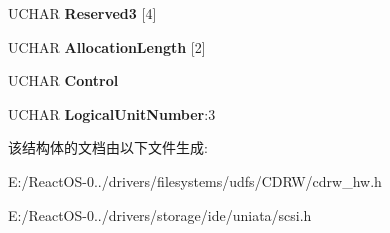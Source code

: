 \begin{DoxyCompactItemize}
\item 
\mbox{\label{struct___c_d_b_1_1___m_o_d_e___s_e_n_s_e10_a22e255f3d06a4b6a8feea7ac8bc6f33f}} 
U\+C\+H\+AR {\bfseries Reserved3} \mbox{[}4\mbox{]}
\item 
\mbox{\label{struct___c_d_b_1_1___m_o_d_e___s_e_n_s_e10_a252fd134d6c5e105852262403f0f500a}} 
U\+C\+H\+AR {\bfseries Allocation\+Length} \mbox{[}2\mbox{]}
\item 
\mbox{\label{struct___c_d_b_1_1___m_o_d_e___s_e_n_s_e10_a9e3bc9cfd082c6bf59c975fcfa9af092}} 
U\+C\+H\+AR {\bfseries Control}
\item 
\mbox{\label{struct___c_d_b_1_1___m_o_d_e___s_e_n_s_e10_a481e64fc3fb3847e4fa88839ab2d1b5d}} 
U\+C\+H\+AR {\bfseries Logical\+Unit\+Number}\+:3
\end{DoxyCompactItemize}


该结构体的文档由以下文件生成\+:\begin{DoxyCompactItemize}
\item 
E\+:/\+React\+O\+S-\/0../drivers/filesystems/udfs/\+C\+D\+R\+W/cdrw\+\_\+hw.\+h\item 
E\+:/\+React\+O\+S-\/0../drivers/storage/ide/uniata/scsi.\+h\end{DoxyCompactItemize}
